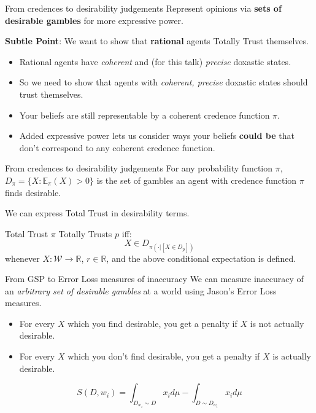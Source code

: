 \documentclass[aspectratio=169, dvipsnames]{beamer}
\newcommand{\R}{\mathbb{R}}
\newcommand{\E}{\mathbb{E}}
\newcommand{\W}{\mathcal{W}}
\begin{document}
\begin{frame}{From credences to desirability judgements}
  Represent opinions via \alert{\textbf{sets of desirable gambles}} for more expressive power.

  \textbf{Subtle Point}: We want to show that \alert{\textbf{rational}} agents Totally Trust themselves.
  \begin{itemize}
    \item Rational agents have \textit{coherent} and (for this talk) \textit{precise} doxastic states.
    \item So we need to show that agents with \textit{coherent, precise} doxastic states should trust themselves. 
    \item Your beliefs are still representable by a coherent credence function $\pi$.
    \item Added expressive power lets us consider ways your beliefs \textbf{\alert{could be}}
      that don't correspond to any coherent credence function.
  \end{itemize}
\end{frame}

\begin{frame}{From credences to desirability judgements}
  For any probability function $\pi$, $D_{\pi} = \{X : \E_{\pi}(X) > 0\}$ is the set of gambles an agent with credence function
  $\pi$ finds desirable.
  
  We can express Total Trust in desirability terms.
  \begin{block}{Total Trust}
    $\pi$ Totally Trusts $p$ iff:
    \begin{equation}
      \label{totTrust}
      X \in D_{\pi(\cdot| [X \in D_p])}
    \end{equation}
    whenever $X: \W \to \R$, $r \in \R$, and the above conditional expectation is defined.
  \end{block}
\end{frame}

\begin{frame}{From GSP to Error Loss measures of inaccuracy}
  We can measure inaccuracy of an \textit{arbitrary set of desirable gambles} at a
  world using Jason's Error Loss measures.
  \begin{itemize}
  \item For every $X$ which you find desirable, you get a penalty if $X$ is not actually desirable.
  \item For every $X$ which you don't find desirable, you get a penalty if $X$ is actually desirable.
  \end{itemize}
  \begin{equation}
      \label{KonekScoreDefAppendix}
      S(D, w_i) = \int_{D_{w_i} \sim D} x_i d\mu - \int_{D \sim D_{w_i}} x_i d\mu 
    \end{equation}
\end{frame}
\end{document}
